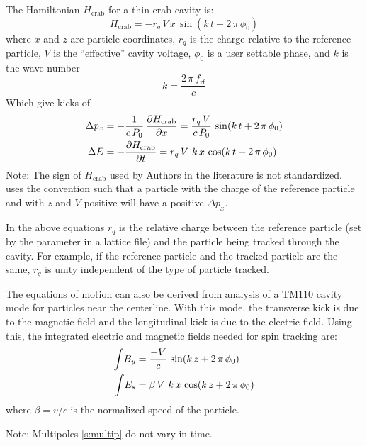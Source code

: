 The Hamiltonian  $H_{\text{crab}}$ for a thin crab cavity is\cite{b:crab1}:
\begin{equation}
  H_{\text{crab}} = -r_q \, V\, x \, \sin(k \, t + 2 \, \pi \, \phi_0)
\end{equation}
where $x$ and $z$ are particle coordinates, $r_q$ is the charge relative to the reference
particle, $V$ is the ``effective'' cavity voltage, $\phi_0$ is a user settable
phase, and $k$ is the wave number
\begin{equation}
  k = \frac{2 \, \pi \, f_{\text{rf}}}{c}
\end{equation}
Which give kicks of
\begin{align} 
  \Delta p_x &= -\frac{1}{c \, P_0} \, \frac{\partial H_{\text{crab}}}{\partial x} = 
    \frac{r_q \, V}{c \, P_0} \, \sin(k \, t + 2 \, \pi \, \phi_0) \nonumber \\ 
  \Delta E &= -\frac{\partial H_{\text{crab}}}{\partial t} = 
    r_q \, V \, \, k \, x \, \cos(k \, t + 2 \, \pi \, \phi_0) 
\end{align} 
Note: The sign of $H_{\text{crab}}$ used by Authors in the literature is not standardized. \bmad
uses the convention such that a particle with the charge of the reference particle and with $z$ and
$V$ positive will have a positive $\Delta p_x$.

In the above equations $r_q$ is the relative charge between the reference particle (set by the
 parameter in a lattice file) and the particle being tracked through the
cavity. For example, if the reference particle and the tracked particle are the same, $r_q$ is
unity independent of the type of particle tracked.

The equations of motion can also be derived from analysis of a TM110 cavity mode for particles near
the centerline\cite{b:kim}. With this mode, the transverse kick is due to the magnetic field and the
longitudinal kick is due to the electric field. Using this, the integrated electric and magnetic
fields needed for spin tracking are:
\begin{align}
  \int \! B_y &= \frac{-V}{c} \, \sin(k \, z + 2 \, \pi \, \phi_0) \nonumber \\ 
  \int \! E_s &=  \beta \, V \, \, k \, x \, \cos(k \, z + 2 \, \pi \, \phi_0) 
\end{align}
where $\beta = v/c$ is the normalized speed of the particle.

Note: Multipoles \ref{s:multip} do not vary in time. 

\newpage

